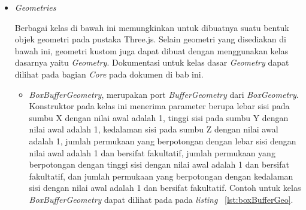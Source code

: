 \begin{itemize}
	\item \textit{Geometries}
	
	Berbagai kelas di bawah ini memungkinkan untuk dibuatnya suatu bentuk objek geometri pada pustaka Three.js. Selain geometri yang disediakan di bawah ini, geometri kustom juga dapat dibuat dengan menggunakan kelas dasarnya yaitu {\it Geometry}. Dokumentasi untuk kelas dasar {\it Geometry} dapat dilihat pada bagian {\it Core} pada dokumen di bab ini.
	
	\begin{itemize}
		\item {\it BoxBufferGeometry}, merupakan port {\it BufferGeometry} dari {\it BoxGeometry}. Konstruktor pada kelas ini menerima parameter berupa lebar sisi pada sumbu X dengan nilai awal adalah 1, tinggi sisi pada sumbu Y dengan nilai awal adalah 1, kedalaman sisi pada sumbu Z dengan nilai awal adalah 1, jumlah permukaan yang berpotongan dengan lebar sisi dengan nilai awal adalah 1 dan bersifat fakultatif,  jumlah permukaan yang berpotongan dengan tinggi sisi dengan nilai awal adalah 1 dan bersifat fakultatif,  dan jumlah permukaan yang berpotongan dengan kedalaman sisi dengan nilai awal adalah 1 dan bersifat fakultatif. Contoh untuk kelas {\it BoxBufferGeometry} dapat dilihat pada pada {\it listing} ~\ref{lst:boxBufferGeo}.
	
\begin{lstlisting}[caption={Contoh penggunaan kelas {\it BoxBufferGeometry}.}, label={lst:boxBufferGeo},captionpos=b]


\end{lstlisting}
\end{itemize}
\end{itemize}
